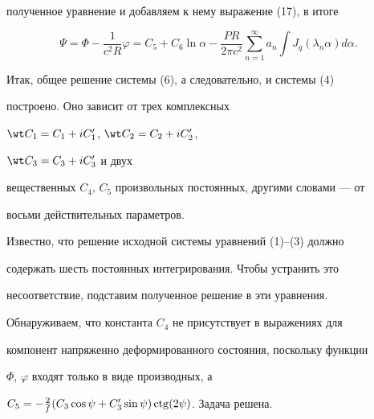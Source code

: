 \begin{pf}
полученное уравнение и добавляем к нему выражение (17), в итоге 


$$ 


\Psi=\Phi-\frac{1}{c^2R}\varphi=C_5+C_6\ln\alpha- 


\frac{P R}{2\pi c^2}\sum^\infty_{n=1}a_n 


\int J_q(\lambda_n\alpha)d\alpha. 


$$ 


Итак, общее решение системы (6), а следовательно, и системы (4) 


построено. Оно зависит от трех комплексных 


$\wt C_1=C_1+i C'_1$, $\wt C_2=C_2+i C'_2$, 


$\wt C_3=C_3+i C'_3$ и двух 


вещественных $C_4$, $C_5$ произвольных постоянных, другими словами --- от 


восьми действительных параметров. 


\end{pf} 


 


Известно, что решение исходной системы уравнений (1)--(3) должно 


содержать шесть постоянных интегрирования. Чтобы устранить это 


несоответствие, подставим полученное решение в эти уравнения. 


Обнаруживаем, что константа $C_4$ не присутствует в выражениях для 


компонент напряженно деформированного состояния, поскольку функции 


$\Phi$, $\varphi$ входят только в виде производных, а 


$C_5=-\frac{2}{f}(C_3\cos\psi+C'_3\sin\psi)\operatorname{ctg}(2\psi)$. Задача решена. 


 


